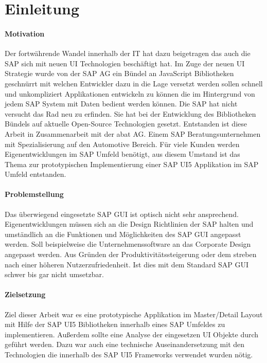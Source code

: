 \section{Einleitung}\label{einleitung}
\paragraph{Motivation}
Der fortwährende Wandel innerhalb der IT hat dazu beigetragen das auch die SAP sich mit neuen UI Technologien beschäftigt hat. Im Zuge der neuen UI Strategie wurde von der SAP AG ein Bündel an JavaScript Bibliotheken geschnürrt mit welchen Entwickler dazu in die Lage versetzt werden sollen schnell und unkompliziert Applikationen entwickeln zu können die im Hintergrund von jedem SAP System mit Daten bedient werden können. Die SAP hat nicht versucht das Rad neu zu erfinden. Sie hat bei der Entwicklung des Bibliotheken Bündels auf aktuelle Open-Source Technologien gesetzt. Entstanden ist diese Arbeit in Zusammenarbeit mit der abat AG. Einem SAP Beratungsunternehmen mit Spezialisierung auf den Automotive Bereich. Für viele Kunden werden Eigenentwicklungen im SAP Umfeld benötigt, aus diesem Umstand ist das Thema zur prototypischen Implementierung einer SAP UI5 Applikation im SAP Umfeld entstanden.

\paragraph{Problemstellung}
Das überwiegend eingesetzte SAP GUI ist optisch nicht sehr ansprechend. Eigenentwicklungen müssen sich an die Design Richtlinien der SAP halten und umständlich an die Funktionen und Möglichkeiten des SAP GUI angepasst werden. Soll beispielweise die Unternehmenssoftware an das Corporate Design angepasst werden. Aus Gründen der Produktivitätssteigerung oder dem streben nach einer höheren Nutzerzufriedenheit. Ist dies mit dem Standard SAP GUI schwer bis gar nicht umsetzbar.

\paragraph{Zielsetzung}
Ziel dieser Arbeit war es eine prototypische Applikation im Master/Detail Layout mit Hilfe der SAP UI5 Bibliotheken innerhalb eines SAP Umfeldes zu implementieren. Außerdem sollte eine Analyse der eingesetzen UI Objekte durch geführt werden. Dazu war auch eine technische Auseinandersetzung mit den Technologien die innerhalb des SAP UI5 Frameworks verwendet wurden nötig.

